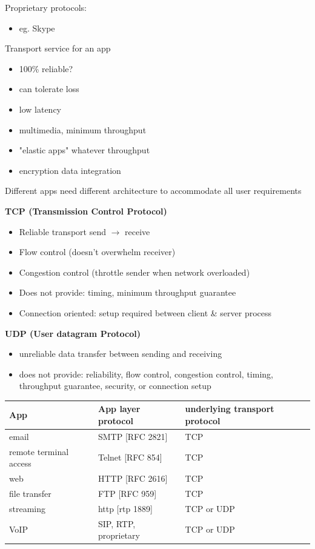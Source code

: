 \documentclass[11pt]{article}
\begin{document}
Proprietary protocols:
\begin{itemize}
\item eg. Skype
\end{itemize}

Transport service for an app
\begin{itemize}
\item 100\% reliable?
\item can tolerate loss
\item low latency
\item multimedia, minimum throughput
\item "elastic apps" whatever throughput
\item encryption data integration
\end{itemize}

Different apps need different architecture to accommodate all user
requirements

\textbf{TCP (Transmission Control Protocol)}
\begin{itemize}
\item Reliable transport send \(\rightarrow\) receive
\item Flow control (doesn't overwhelm receiver)
\item Congestion control (throttle sender when network overloaded)
\item Does not provide: timing, minimum throughput guarantee
\item Connection oriented: setup required between client \& server process
\end{itemize}

\textbf{UDP (User datagram Protocol)}
\begin{itemize}
\item unreliable data transfer between sending and receiving
\item does not provide: reliability, flow control, congestion control,
timing, throughput guarantee, security, or connection setup
\end{itemize}


\begin{center}
\begin{tabular}{lll}
\textbf{App} & \textbf{App layer protocol} & \textbf{underlying transport protocol}\\
\hline
email & SMTP [RFC 2821] & TCP\\
remote terminal access & Telnet [RFC 854] & TCP\\
web & HTTP [RFC 2616] & TCP\\
file transfer & FTP [RFC 959] & TCP\\
streaming & http [rtp 1889] & TCP or UDP\\
VoIP & SIP, RTP, proprietary & TCP or UDP\\
\end{tabular}
\end{center}
\end{document}
